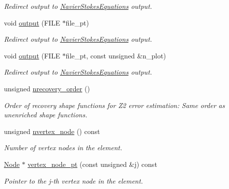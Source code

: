 \begin{DoxyCompactItemize}
\begin{DoxyCompactList}\small\item\em Redirect output to \hyperlink{classoomph_1_1NavierStokesEquations}{Navier\+Stokes\+Equations} output. \end{DoxyCompactList}\item 
void \hyperlink{classoomph_1_1GeneralisedNewtonianAxisymmetricTCrouzeixRaviartElement_a8f3ca9d5dfb8d259e26fca5bef65fab2}{output} (F\+I\+LE $\ast$file\+\_\+pt)
\begin{DoxyCompactList}\small\item\em Redirect output to \hyperlink{classoomph_1_1NavierStokesEquations}{Navier\+Stokes\+Equations} output. \end{DoxyCompactList}\item 
void \hyperlink{classoomph_1_1GeneralisedNewtonianAxisymmetricTCrouzeixRaviartElement_a09c3f2cc2d733be8b96daa8e8f8b90cd}{output} (F\+I\+LE $\ast$file\+\_\+pt, const unsigned \&n\+\_\+plot)
\begin{DoxyCompactList}\small\item\em Redirect output to \hyperlink{classoomph_1_1NavierStokesEquations}{Navier\+Stokes\+Equations} output. \end{DoxyCompactList}\item 
unsigned \hyperlink{classoomph_1_1GeneralisedNewtonianAxisymmetricTCrouzeixRaviartElement_a2f891403acf14ec3ca57a0b047b69ed5}{nrecovery\+\_\+order} ()
\begin{DoxyCompactList}\small\item\em Order of recovery shape functions for Z2 error estimation\+: Same order as unenriched shape functions. \end{DoxyCompactList}\item 
unsigned \hyperlink{classoomph_1_1GeneralisedNewtonianAxisymmetricTCrouzeixRaviartElement_a8f49d7d8329670f70c356aab38ab86be}{nvertex\+\_\+node} () const
\begin{DoxyCompactList}\small\item\em Number of vertex nodes in the element. \end{DoxyCompactList}\item 
\hyperlink{classoomph_1_1Node}{Node} $\ast$ \hyperlink{classoomph_1_1GeneralisedNewtonianAxisymmetricTCrouzeixRaviartElement_a325116915783d868619740485dea69fd}{vertex\+\_\+node\+\_\+pt} (const unsigned \&j) const
\begin{DoxyCompactList}\small\item\em Pointer to the j-\/th vertex node in the element. \end{DoxyCompactList}\item 

\end{DoxyCompactItemize}
